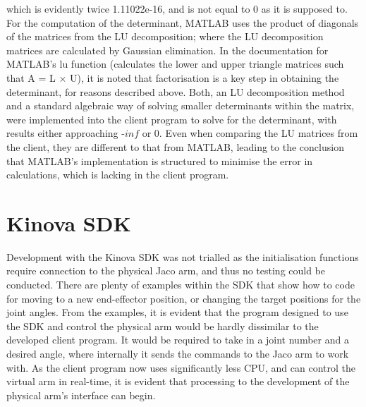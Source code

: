 \documentclass[12pt,openany,a4paper]{book}
\begin{document}
which is evidently twice 1.11022e-16, and is not equal to 0 as it is supposed to. For the computation of the determinant, MATLAB uses the product of diagonals of the matrices from the LU decomposition; where the LU decomposition matrices are calculated by Gaussian elimination. In the documentation for MATLAB's lu function (calculates the lower and upper triangle matrices such that A = L $\times$ U), it is noted that factorisation is a key step in obtaining the determinant, for reasons described above. Both, an LU decomposition method and a standard algebraic way of solving smaller determinants within the matrix, were implemented into the client program to solve for the determinant, with results either approaching -$inf$ or 0. Even when comparing the LU matrices from the client, they are different to that from MATLAB, leading to the conclusion that MATLAB's implementation is structured to minimise the error in calculations, which is lacking in the client program.


\section{Kinova SDK}
Development with the Kinova SDK was not trialled as the initialisation functions require connection to the physical Jaco arm, and thus no testing could be conducted. There are plenty of examples within the SDK that show how to code for moving to a new end-effector position, or changing the target positions for the joint angles. From the examples, it is evident that the program designed to use the SDK and control the physical arm would be hardly dissimilar to the developed client program. It would be required to take in a joint number and a desired angle, where internally it sends the commands to the Jaco arm to work with. As the client program now uses significantly less CPU, and can control the virtual arm in real-time, it is evident that processing to the development of the physical arm's interface can begin.
\end{document}
